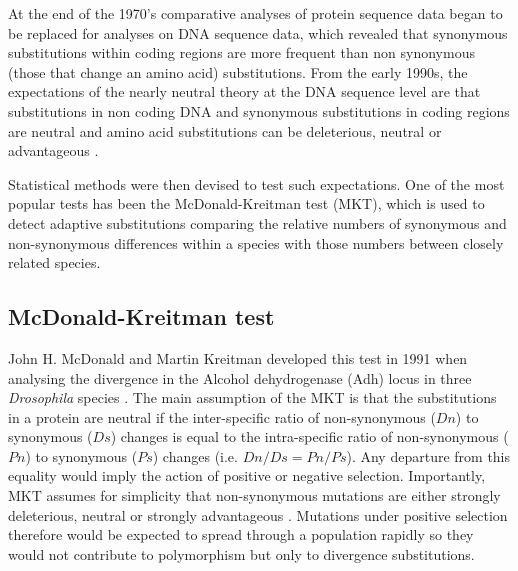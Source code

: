 At the end of the 1970's comparative analyses of protein sequence data began to be replaced for analyses on DNA sequence data, which revealed that synonymous substitutions within coding regions are more frequent than non synonymous (those that change an amino acid) substitutions.
%
From the early 1990s, the expectations of the nearly neutral theory at the DNA sequence level are that substitutions in non coding DNA and synonymous substitutions in coding regions are neutral and amino acid substitutions can be deleterious, neutral or advantageous \citep{Ohta1996}.

Statistical methods were then devised to test such expectations. One of the most popular tests has been the McDonald-Kreitman test (MKT), which is used to detect adaptive substitutions comparing the relative numbers of synonymous and non-synonymous differences within a species with those numbers between closely related species.

\subsection{McDonald-Kreitman test}


John H. McDonald and Martin Kreitman developed this test in 1991 when analysing the divergence in the Alcohol dehydrogenase (Adh) locus in three \textit{Drosophila} species	\citep{McDonald1991}. 
%
The main assumption of the MKT is that the substitutions in a protein are neutral if the inter-specific ratio of non-synonymous ($Dn$) to synonymous ($Ds$) changes is equal to the intra-specific ratio of non-synonymous ($Pn$) to synonymous ($Ps$) changes (i.e. $Dn/Ds = Pn/Ps$).
Any departure from this equality would imply the action of positive or negative selection.
%
Importantly, MKT assumes for simplicity that non-synonymous mutations are either strongly deleterious, neutral or strongly advantageous \citep{McDonald1991}.
%
Mutations under positive selection therefore would be expected to spread through a population rapidly so they would not contribute to polymorphism but only to divergence substitutions.

